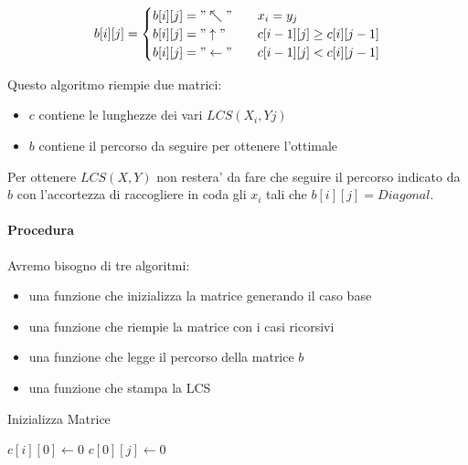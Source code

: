 \[
    b[i][j] =
    \begin{cases} 
        \text{$b[i][j] = "\nwarrow"$} & \quad \text{$x_{i} = y_{j}$} \\
        \text{$b[i][j] = "\uparrow"$} & \quad \text{$c[i-1][j] \geq c[i][j-1]$} \\
        \text{$b[i][j] = "\leftarrow"$} & \quad \text{$c[i-1][j] < c[i][j-1]$}
    \end{cases}
\]

Questo algoritmo riempie due matrici:
\begin{itemize}
    \item $c$ contiene le lunghezze dei vari $LCS(X_{i}, Y{j})$
    \item $b$ contiene il percorso da seguire per ottenere l'ottimale
\end{itemize}

Per ottenere $LCS(X, Y)$ non restera' da fare che seguire il percorso indicato da $b$ con l'accortezza di raccogliere in coda gli $x_{i}$ tali che $b[i][j] = Diagonal$.

\paragraph{Procedura}

Avremo bisogno di tre algoritmi:
\begin{itemize}
    \item una funzione che inizializza la matrice generando il caso base
    \item una funzione che riempie la matrice con i casi ricorsivi
    \item una funzione che legge il percorso della matrice $b$
    \item una funzione che stampa la LCS
\end{itemize}

\begin{algorithm}
    \renewcommand\thealgorithm{}
    \caption{Inizializza Matrice}
    \begin{algorithmic}
                \State $c[i][0] \gets 0$
            \EndFor
                \State $c[0][j] \gets 0$
            \EndFor
        \EndProcedure
    \end{algorithmic}
\end{algorithm}

